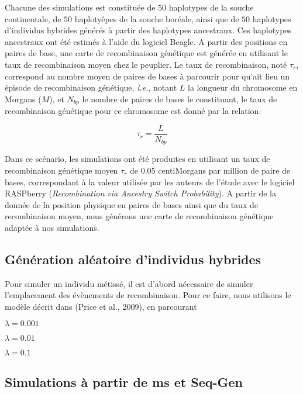 \documentclass[12pt,twoside]{reedthesis}
\begin{document}
  Chacune des simulations est constituée de \(50\) haplotypes de la souche
  continentale, de \(50\) haplotyêpes de la souche boréale, ainsi que de
  \(50\) haplotypes d'individus hybrides générés à partir des haplotypes
  ancestraux. Ces haplotypes ancestraux ont été estimés à l'aide du
  logiciel Beagle. A partir des positions en paires de base, une carte de
  recombinaison génétique est générée en utilisant le taux de
  recombinaison moyen chez le peuplier. Le taux de recombinaison, noté
  \(\tau_r\), correspond au nombre moyen de paires de bases à parcourir
  pour qu'ait lieu un épisode de recombinaison génétique, \emph{i.e.},
  notant \(L\) la longueur du chromosome en Morgans (\(M\)), et \(N_{bp}\)
  le nombre de paires de bases le constituant, le taux de recombinaison
  génétique pour ce chromosome est donné par la relation:
  
  \[\tau_r = \frac{L}{N_{bp}}\]
  
  Dans ce scénario, les simulations ont été produites en utilisant un taux
  de recombinaison génétique moyen \(\tau_r\) de \(0.05\) centiMorgans par
  million de paire de bases, correspondant à la valeur utilisée par les
  auteurs de l'étude avec le logiciel RASPberry
  (\textit{Recombination via Ancestry Switch Probability}). A partir de la
  donnée de la position physique en paires de bases ainsi que du taux de
  recombinaison moyen, nous générons une carte de recombinaison génétique
  adaptée à nos simulations.
  
  \subsection{Génération aléatoire d'individus
  hybrides}\label{generation-aleatoire-dindividus-hybrides}
  
  Pour simuler un individu métissé, il est d'abord nécessaire de simuler
  l'emplacement des évènements de recombinaison. Pour ce faire, nous
  utilisons le modèle décrit dans (Price et al., 2009), en parcourant
  
  \(\lambda = 0.001\)
  
  \(\lambda = 0.01\)
  
  \(\lambda = 0.1\)
  
  \newpage
  
  \subsection{Simulations à partir de ms et
  Seq-Gen}\label{simulations-a-partir-de-ms-et-seq-gen}
  
\end{document}
